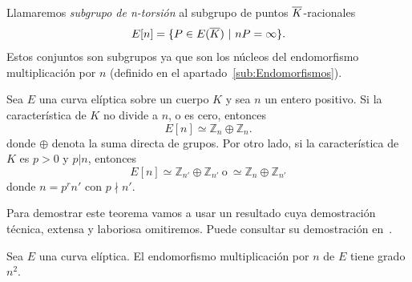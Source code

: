 \begin{definicion}
	Llamaremos \emph{subgrupo de n-torsión} al subgrupo de puntos $\overline{K}$-racionales
	$$
		E[n] = \{ P \in E(\overline{K}) \ | \  n P = \infty \}.
	$$
	Estos conjuntos son subgrupos ya que son los núcleos del endomorfismo multiplicación por $n$ (definido en el apartado~\ref{sub:Endomorfismos}).
\end{definicion}

%

\begin{teorema}\label{th:estructura subgrupos torsión}
	Sea $E$ una curva elíptica sobre un cuerpo $K$ y sea $n$ un entero positivo. Si la característica de $K$ no divide a $n$, o es cero, entonces
	$$
		E[n] \simeq \mathbb{Z}_n \oplus \mathbb{Z}_n.
	$$
	donde $\oplus$ denota la suma directa de grupos. Por otro lado, si la característica de $K$ es $p > 0$ y $p | n$, entonces
	$$
		E[n] \simeq \mathbb{Z}_{n'} \oplus \mathbb{Z}_{n'} \ \textrm{o} \ \simeq \mathbb{Z}_{n} \oplus \mathbb{Z}_{n'}
	$$
	donde $n = p^r n'$ con $p \nmid n'$.
\end{teorema}

Para demostrar este teorema vamos a usar un resultado cuya demostración técnica, extensa y laboriosa omitiremos. Puede consultar su demostración en~\cite[sec. 3.2]{Washington:2008}.

\begin{proposicion}\label{pp:grado endomorfismo multiplicación}
	Sea $E$ una curva elíptica. El endomorfismo multiplicación por $n$ de $E$ tiene grado $n^2$.
\end{proposicion}

